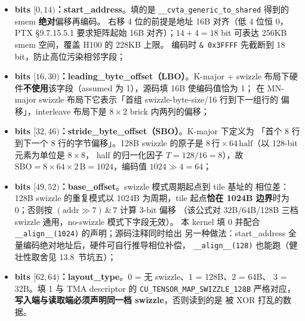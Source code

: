 \begin{itemize}
  \item \textbf{bits $[0, 14)$：start\_address}。填的是
        \texttt{\_\allowbreak{}\_\allowbreak{}cvta\_\allowbreak{}generic\_\allowbreak{}to\_\allowbreak{}shared} 得到的 smem \textbf{绝对}偏移再编码。
        右移 4 位的前提是地址 16B 对齐（低 4 位恒 0，PTX §9.7.15.5.1 要求矩阵起始
        16B 对齐）；$14 + 4 = 18$ bit 可表达 256KB smem 空间，覆盖 H100 的 228KB 上限。
        编码时 \texttt{\& 0x3FFFF} 先截断到 18 bit，防止高位污染相邻字段；
  \item \textbf{bits $[16, 30)$：leading\_byte\_offset（LBO）}。K-major + swizzle
        布局下硬件\textbf{不使用}该字段（assumed 为 1），源码填 16B 使编码值恰为 1；
        在 MN-major swizzle 布局下它表示「首组 swizzle-byte-size/16 行到下一组行的
        偏移」，interleave 布局下是 $8 \times 2$ brick 内两列的偏移；
  \item \textbf{bits $[32, 46)$：stride\_byte\_offset（SBO）}。K-major 下定义为
        「首个 8 行到下一个 8 行的字节偏移」。128B swizzle 的原子是
        $8\,\text{行} \times 64\,\text{half}$（以 128-bit 元素为单位是 $8 \times 8$，
        half 的归一化因子 $T = 128/16 = 8$），故
        $\mathrm{SBO} = 8 \times 64 \times 2\,\mathrm{B} = 1024$，编码值
        $1024 \gg 4 = 64$；
  \item \textbf{bits $[49, 52)$：base\_offset}。swizzle 模式周期起点到 tile 基址的
        相位差：128B swizzle 的重复模式以 1024B 为周期，tile 起点\textbf{恰在
        1024B 边界}时为 0；否则按 $(\mathrm{addr} \gg 7) \,\&\, 7$ 计算 3-bit 偏移
        （该公式对 32B/64B/128B 三档 swizzle 通用，no-swizzle 模式下字段无效）。
        本 kernel 填 0 并配合 \texttt{\_\allowbreak{}\_\allowbreak{}align\_\allowbreak{}\_\allowbreak{}(1024)} 的声明；源码注释同时给出
        另一种做法：start\_address 全量编码绝对地址后，硬件可自行推导相位补偿，
        \texttt{\_\allowbreak{}\_\allowbreak{}align\_\allowbreak{}\_\allowbreak{}(128)} 也能跑（健壮性取舍见 13.8~节坑五）；
  \item \textbf{bits $[62, 64)$：layout\_type}。0 = 无 swizzle、1 = 128B、2 = 64B、
        3 = 32B。填 1 与 TMA descriptor 的 \texttt{CU\_\allowbreak{}TENSOR\_\allowbreak{}MAP\_\allowbreak{}SWIZZLE\_\allowbreak{}128\allowbreak{}B}
        严格对应，\textbf{写入端与读取端必须声明同一档 swizzle}，否则读到的是
        被 XOR 打乱的数据。
\end{itemize}

